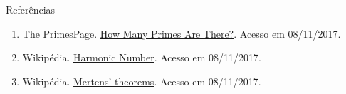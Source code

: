 \begin{frame}[fragile]{Referências}

    \begin{enumerate}
        \item The PrimesPage. \href{https://primes.utm.edu/howmany.html}{How Many Primes Are 
            There?}. Acesso em 08/11/2017.

        \item Wikipédia. \href{https://en.wikipedia.org/wiki/Harmonic_number}{Harmonic Number}. 
            Acesso em 08/11/2017.

        \item Wikipédia. \href{https://en.wikipedia.org/wiki/Mertens%27_theorems}{Mertens' 
            theorems}. Acesso em 08/11/2017.
    \end{enumerate}

\end{frame}
